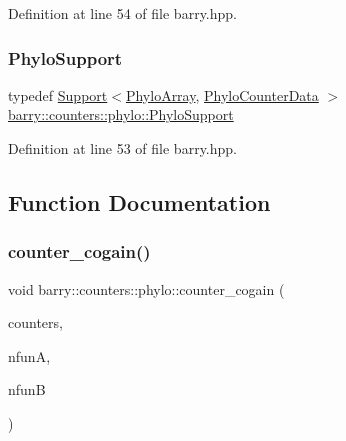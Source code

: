 Definition at line 54 of file barry.\+hpp.

\mbox{\label{namespacebarry_1_1counters_1_1phylo_a40ee9e679f0f95fdeeb18cd0a2e45d48}} 
\subsubsection{\texorpdfstring{Phylo\+Support}{PhyloSupport}}
{\footnotesize\ttfamily typedef \hyperlink{classbarry_1_1_support}{Support}$<$\hyperlink{namespacebarry_1_1counters_1_1phylo_a50a6652c16ff57d76b4099043d6a0bbb}{Phylo\+Array}, \hyperlink{namespacebarry_1_1counters_1_1phylo_a6ecc0d8ab76f8dc2db152221a8e9e95a}{Phylo\+Counter\+Data} $>$ \hyperlink{namespacebarry_1_1counters_1_1phylo_a40ee9e679f0f95fdeeb18cd0a2e45d48}{barry\+::counters\+::phylo\+::\+Phylo\+Support}}



Definition at line 53 of file barry.\+hpp.



\subsection{Function Documentation}
\mbox{\label{namespacebarry_1_1counters_1_1phylo_ac5dde4b651c7600bd8533c2db9a66632}} 
\subsubsection{\texorpdfstring{counter\+\_\+cogain()}{counter\_cogain()}}
{\footnotesize\ttfamily void barry\+::counters\+::phylo\+::counter\+\_\+cogain (\begin{DoxyParamCaption}\item[{\hyperlink{namespacebarry_1_1counters_1_1phylo_a2f117d1cd1dff67e1539cbc0aef5766a}{Phylo\+Counter\+Vector} $\ast$}]{counters,  }\item[{\hyperlink{namespacebarry_a11dfc53ddb4672278319aa04f1e09a6c}{uint}}]{nfunA,  }\item[{\hyperlink{namespacebarry_a11dfc53ddb4672278319aa04f1e09a6c}{uint}}]{nfunB }\end{DoxyParamCaption})\hspace{0.3cm}{\ttfamily [inline]}}



